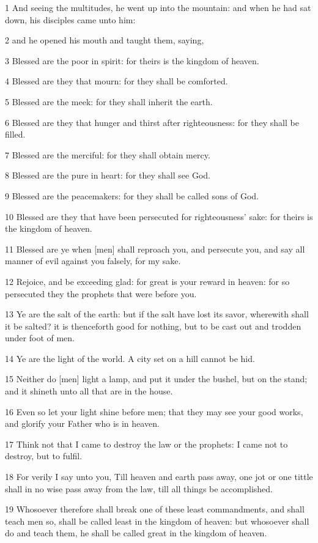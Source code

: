 \par 1 And seeing the multitudes, he went up into the mountain: and when he had sat down, his disciples came unto him:
\par 2 and he opened his mouth and taught them, saying,
\par 3 Blessed are the poor in spirit: for theirs is the kingdom of heaven.
\par 4 Blessed are they that mourn: for they shall be comforted.
\par 5 Blessed are the meek: for they shall inherit the earth.
\par 6 Blessed are they that hunger and thirst after righteousness: for they shall be filled.
\par 7 Blessed are the merciful: for they shall obtain mercy.
\par 8 Blessed are the pure in heart: for they shall see God.
\par 9 Blessed are the peacemakers: for they shall be called sons of God.
\par 10 Blessed are they that have been persecuted for righteousness' sake: for theirs is the kingdom of heaven.
\par 11 Blessed are ye when [men] shall reproach you, and persecute you, and say all manner of evil against you falsely, for my sake.
\par 12 Rejoice, and be exceeding glad: for great is your reward in heaven: for so persecuted they the prophets that were before you.
\par 13 Ye are the salt of the earth: but if the salt have lost its savor, wherewith shall it be salted? it is thenceforth good for nothing, but to be cast out and trodden under foot of men.
\par 14 Ye are the light of the world. A city set on a hill cannot be hid.
\par 15 Neither do [men] light a lamp, and put it under the bushel, but on the stand; and it shineth unto all that are in the house.
\par 16 Even so let your light shine before men; that they may see your good works, and glorify your Father who is in heaven.
\par 17 Think not that I came to destroy the law or the prophets: I came not to destroy, but to fulfil.
\par 18 For verily I say unto you, Till heaven and earth pass away, one jot or one tittle shall in no wise pass away from the law, till all things be accomplished.
\par 19 Whosoever therefore shall break one of these least commandments, and shall teach men so, shall be called least in the kingdom of heaven: but whosoever shall do and teach them, he shall be called great in the kingdom of heaven.
